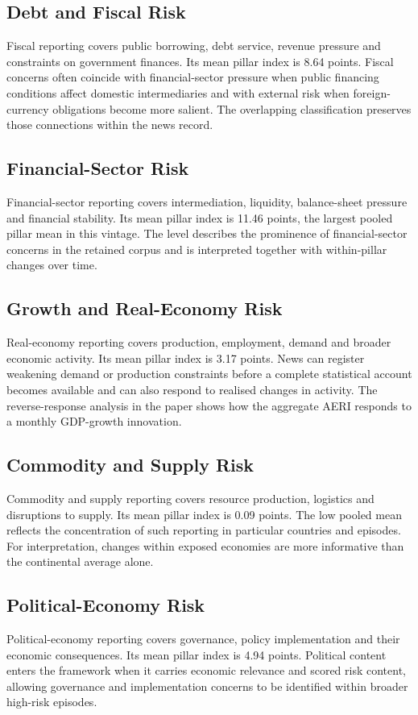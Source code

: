 \documentclass[11pt]{article}
\begin{document}
\subsection{Debt and Fiscal Risk}
Fiscal reporting covers public borrowing, debt service, revenue pressure and constraints on government finances. Its mean pillar index is 8.64 points. Fiscal concerns often coincide with financial-sector pressure when public financing conditions affect domestic intermediaries and with external risk when foreign-currency obligations become more salient. The overlapping classification preserves those connections within the news record.

\subsection{Financial-Sector Risk}
Financial-sector reporting covers intermediation, liquidity, balance-sheet pressure and financial stability. Its mean pillar index is 11.46 points, the largest pooled pillar mean in this vintage. The level describes the prominence of financial-sector concerns in the retained corpus and is interpreted together with within-pillar changes over time.

\subsection{Growth and Real-Economy Risk}
Real-economy reporting covers production, employment, demand and broader economic activity. Its mean pillar index is 3.17 points. News can register weakening demand or production constraints before a complete statistical account becomes available and can also respond to realised changes in activity. The reverse-response analysis in the paper shows how the aggregate AERI responds to a monthly GDP-growth innovation.

\subsection{Commodity and Supply Risk}
Commodity and supply reporting covers resource production, logistics and disruptions to supply. Its mean pillar index is 0.09 points. The low pooled mean reflects the concentration of such reporting in particular countries and episodes. For interpretation, changes within exposed economies are more informative than the continental average alone.

\subsection{Political-Economy Risk}
Political-economy reporting covers governance, policy implementation and their economic consequences. Its mean pillar index is 4.94 points. Political content enters the framework when it carries economic relevance and scored risk content, allowing governance and implementation concerns to be identified within broader high-risk episodes.
\end{document}
